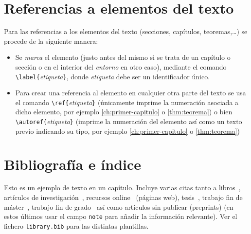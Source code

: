 \section{Referencias a elementos del texto}\label{sec:referencias}

Para las referencias a los elementos del texto (secciones, capítulos, teoremas,\ldots) se procede de la siguiente manera:
\begin{itemize}
  \item Se \emph{marca} el elemento (justo antes del mismo si se trata de un capítulo o sección o en el interior del \emph{entorno} en otro caso), mediante el comando \verb+\label{+\emph{etiqueta}\verb+}+, donde \emph{etiqueta} debe ser un identificador único.
  \item Para crear una referencia al elemento en cualquier otra parte del texto se usa el comando \verb+\ref{+\emph{etiqueta}\verb+}+ (únicamente imprime la numeración asociada a dicho elemento, por ejemplo \ref{ch:primer-capitulo} o \ref{thm:teorema}) o bien \verb+\autoref{+\emph{etiqueta}\verb+}+ (imprime la numeración del elemento así como un texto previo indicando su tipo, por ejemplo \autoref{ch:primer-capitulo} o \autoref{thm:teorema})
\end{itemize}




\section{Bibliografía e índice}

Esto es un ejemplo de texto en un capítulo. Incluye varias citas tanto a libros~\cite{Aigner2018}, artículos de investigación~\cite{Euler1985}, recursos online~\cite{EulerWiki} (páginas web), tesis~\cite{CitekeyPhdthesis}, trabajo fin de máster~\cite{CitekeyMastersthesis}, trabajo fin de grado~\cite{CiteKeyBachelorsthesis} así como artículos sin publicar (preprints) \cite{castroinfantes2022conjugate} (en estos últimos usar el campo \texttt{note} para añadir la información relevante). Ver el fichero \texttt{library.bib} para las distintas plantillas. 


\endinput
